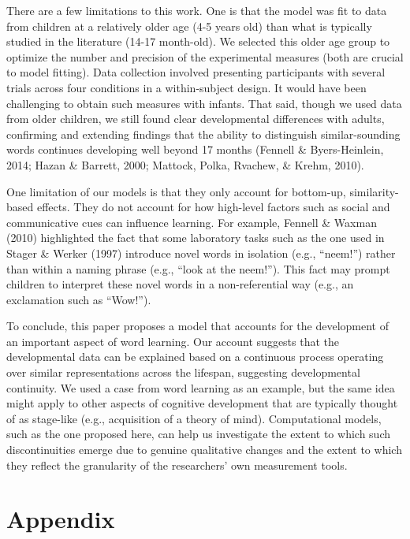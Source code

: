 \documentclass[english,,man]{apa6}
\begin{document}
There are a few limitations to this work. One is that the model was fit to data from children at a relatively older age (4-5 years old) than what is typically studied in the literature (14-17 month-old). We selected this older age group to optimize the number and precision of the experimental measures (both are crucial to model fitting). Data collection involved presenting participants with several trials across four conditions in a within-subject design. It would have been challenging to obtain such measures with infants. That said, though we used data from older children, we still found clear developmental differences with adults, confirming and extending findings that the ability to distinguish similar-sounding words continues developing well beyond 17 months (Fennell \& Byers-Heinlein, 2014; Hazan \& Barrett, 2000; Mattock, Polka, Rvachew, \& Krehm, 2010).

One limitation of our models is that they only account for bottom-up, similarity-based effects. They do not account for how high-level factors such as social and communicative cues can influence learning. For example, Fennell \& Waxman (2010) highlighted the fact that some laboratory tasks such as the one used in Stager \& Werker (1997) introduce novel words in isolation (e.g., \enquote{neem!}) rather than within a naming phrase (e.g., \enquote{look at the neem!}). This fact may prompt children to interpret these novel words in a non-referential way (e.g., an exclamation such as \enquote{Wow!}).

To conclude, this paper proposes a model that accounts for the development of an important aspect of word learning. Our account suggests that the developmental data can be explained based on a continuous process operating over similar representations across the lifespan, suggesting developmental continuity. We used a case from word learning as an example, but the same idea might apply to other aspects of cognitive development that are typically thought of as stage-like (e.g., acquisition of a theory of mind). Computational models, such as the one proposed here, can help us investigate the extent to which such discontinuities emerge due to genuine qualitative changes and the extent to which they reflect the granularity of the researchers' own measurement tools.

\hypertarget{appendix}{%
\section{Appendix}\label{appendix}}
\end{document}
